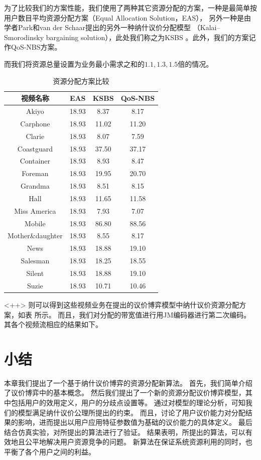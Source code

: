 为了比较我们的方案性能，我们使用了两种其它资源分配的方案，一种是最简单按用户数目平均资源分配方案（Equal Allocation Solution，EAS），
另外一种是由学者Park和van der Schaar提出的另外一种纳什议价分配模型 （Kalai–Smorodinsky  bargaining  solution），此处我们称之为KSBS \cite{ParkVanderSchaar2007}。此外，我们的方案记作QoS-NBS方案。

而我们将资源总量设置为业务最小需求之和的$1.1, 1.3, 1.5$倍的情况。
\begin{table}
    \wuhao
    \centering
    \begin{tabular}{cccc}
    \toprule
    视频名称 & EAS & KSBS & QoS-NBS\\
    \midrule
Akiyo           	 & 18.93 & 8.37 & 8.17 \\ 
Carphone        	 & 18.93 & 11.02 & 11.20 \\ 
Clarie          	 & 18.93 & 8.07 & 7.59 \\ 
Coastguard      	 & 18.93 & 37.50 & 37.17 \\ 
Container       	 & 18.93 & 8.93 & 8.47 \\ 
Foreman         	 & 18.93 & 19.95 & 20.70 \\ 
Grandma         	 & 18.93 & 8.51 & 8.15 \\ 
Hall            	 & 18.93 & 11.65 & 11.58 \\ 
Miss America    	 & 18.93 & 7.93 & 7.07 \\ 
Mobile          	 & 18.93 & 86.80 & 88.56 \\ 
Mother\&daughter	 & 18.93 & 8.55 & 8.17 \\ 
News            	 & 18.93 & 18.88 & 19.10 \\ 
Salesman        	 & 18.93 & 18.25 & 18.55 \\ 
Silent          	 & 18.93 & 18.88 & 19.10 \\ 
Suzie           	 & 18.93 & 10.71 & 10.46 \\ 
\bottomrule
    \end{tabular}
    \caption{资源分配方案比较}
    \label{tab:<+label+>}
\end{table}<++>
则可以得到这些视频业务在提出的议价博弈模型中纳什议价资源分配方案，如表 所示。
而且，我们对分配的带宽值进行用JM编码器进行第二次编码。其各个视频流相应的结果如下。



\section{小结}
本章我们提出了一个基于纳什议价博弈的资源分配新算法。
首先，我们简单介绍了议价博弈中的基本概念。
然后我们提出了一个新的资源分配议价博弈模型，其中包括用户的效用定义，用户的分歧点设置等。
通过对模型的理论分析，可知我们的模型满足纳什议价公理所提出的约束。
而且，讨论了用户议价能力对分配结果的影响，进而提出以用户应用特征参数值为基础的议价能力的具体定义。
最后结合仿真实验，对所提出的算法进行了验证。
结果表明，所提出的算法，可以有效地且公平地解决用户资源竞争的问题。
新算法在保证系统资源利用的同时，也平衡了各个用户之间的利益。


